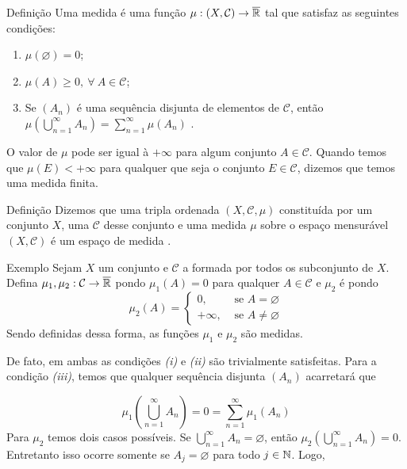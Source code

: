 \begin{env}{Definição}
\label{def:medida}
    Uma medida é uma função $\mu: (X, \mathcal{C}) \to \operatorname{\overline{\mathbb{R}}}$ tal que satisfaz as seguintes condições:
    \begin{enumerate}[label* = (\roman*)]
        \item $\mu(\varnothing) = 0$;
        \item $\mu(A) \geq 0, \ \forall \ A \in \mathcal{C}$;
        \item Se $(A_n)$ é uma sequência disjunta de elementos de  $\mathcal{C}$, então 
        $\displaystyle\mu\left(\bigcup_{n = 1}^\infty A_n\right) = \sum_{n = 1}^\infty\mu(A_n)$ \cite[p.19, tradução nossa]{bartle}.
        
    \end{enumerate}
\end{env}

O valor de $\mu$ pode ser igual à $+\infty$ para algum conjunto $A \in \mathcal{C}$.
Quando temos que $\mu(E) < +\infty$ para qualquer que seja o conjunto $E \in \mathcal{C}$, dizemos que temos uma medida finita.

\begin{env}{Definição}
	\label{def:espaço-de-medida}
	Dizemos que uma tripla ordenada $(X, \mathcal{C}, \mu)$ constituída por um conjunto $X$, uma \sigal $\mathcal{C}$ desse conjunto e uma medida $\mu$ sobre o espaço mensurável $(X, \mathcal{C})$ é um espaço de medida \cite{bartle}.
\end{env}



\begin{env}{Exemplo}
    Sejam $X$ um conjunto e $\mathcal{C}$ a \sigal formada por todos os subconjunto de $X$.    
    Defina $\mu_1, \mu_2:\mathcal{C} \to \operatorname{\overline{\mathbb{R}}}$ pondo $\mu_1(A) = 0$ para qualquer  $A \in \mathcal{C}$ e 
    $\mu_2$ é  pondo 
	$$\mu_2(A) = \left\{\begin{array}{cc}
	0, & \textrm{\ se \ } A = \varnothing \\
	+\infty,& \textrm{\ se \ } A \neq \varnothing
	\end{array}\right.$$
	Sendo definidas dessa forma, as funções $\mu_1$ e $\mu_2$ são medidas.
	\end{env}

De fato, em ambas as condições \textit{(i)} e \textit{(ii)} são trivialmente satisfeitas.
Para a condição \textit{(iii)}, temos que qualquer sequência disjunta $(A_n)$ acarretará que

$$\mu_1\left(\bigcup_{n = 1}^\infty A_n\right) = 0 = \sum_{n = 1}^\infty \mu_1(A_n) $$
Para $\mu_2$ temos dois casos possíveis.
Se  $\displaystyle \bigcup_{n = 1}^\infty A_n  = \varnothing$, então $\mu_2\left(\displaystyle \bigcup_{n = 1}^\infty A_n\right) = 0$. Entretanto isso ocorre somente se $A_j = \varnothing$ para todo $j \in \operatorname{\mathbb{N}}$.
Logo, 

